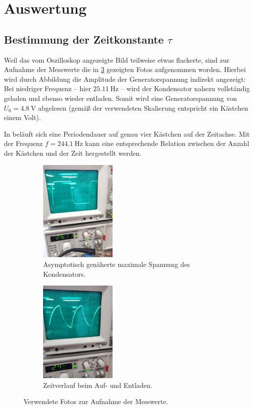 \section{Auswertung}
\label{sec:Auswertung}

\subsection{Bestimmung der Zeitkonstante $\tau$}

Weil das vom Oszilloskop angezeigte Bild teilweise etwas flackerte, sind zur Aufnahme der Messwerte die in \ref{fig:messA}
gezeigten Fotos aufgenommen worden. 
Hierbei wird durch Abbildung  die Amplitude der Generatorspannung indirekt angezeigt: 
Bei niedriger Frequenz -- hier ${\SI{25.11}{\hertz}}$ -- wird der Kondensator nahezu vollständig geladen und ebenso wieder entladen. 
Somit wird eine Generatorspannung von ${U_0=\SI{4.8}{\volt}}$ abgelesen (gemäß der verwendeten Skalierung entspricht 
ein Kästchen einem Volt). 

In  beläuft sich eine Periodendauer auf genau vier Kästchen auf der Zeitachse. 
Mit der Frequenz ${f=\SI{244.1}{\hertz}}$ kann eine entsprechende Relation zwischen der Anzahl der Kästchen und der 
Zeit hergestellt werden. 

\begin{figure}
    \centering
    \begin{subfigure}{0.48\textwidth}
        \centering
        \includegraphics[height=5cm]{plots/maxLadungKond.jpg}
        \caption{Asymptotisch genäherte maximale Spannung des Kondensators.}
        \label{fig:maxU_C}
    \end{subfigure}
    \begin{subfigure}{0.48\textwidth}
        \centering
        \includegraphics[height=5cm]{plots/LadungKondZacken.jpg}
        \caption{Zeitverlauf beim Auf- und Entladen.}
        \label{fig:UpAndDown}
    \end{subfigure}
    \caption{Verwendete Fotos zur Aufnahme der Messwerte.}
    \label{fig:messA}
\end{figure}

